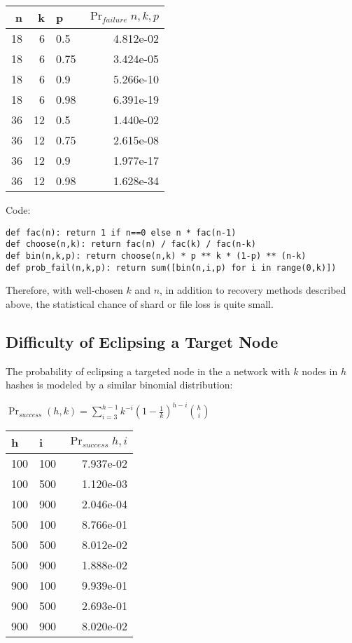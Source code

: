 \documentclass[a4paper,10pt]{article}
\begin{document}
\begin{table}[hbt!]
\begin{center}
\begin{tabular}{r r l r}
n & k & p & $\Pr_{failure}{n,k,p}$\\
\hline  18 & 6  &  0.5  & 4.812e-02\\
\hline  18 & 6  &  0.75 &3.424e-05\\
\hline  18 & 6  &  0.9  & 5.266e-10\\
\hline  18 & 6  &  0.98 &6.391e-19\\
\hline  36 & 12 &  0.5  &1.440e-02\\
\hline  36 & 12 &  0.75 &2.615e-08\\
\hline  36 & 12 &  0.9  &1.977e-17\\
\hline  36 & 12 &  0.98 &1.628e-34\\
\end{tabular}
\end{center}
\end{table}

Code:
\begin{lstlisting}
def fac(n): return 1 if n==0 else n * fac(n-1)
def choose(n,k): return fac(n) / fac(k) / fac(n-k)
def bin(n,k,p): return choose(n,k) * p ** k * (1-p) ** (n-k)
def prob_fail(n,k,p): return sum([bin(n,i,p) for i in range(0,k)])
\end{lstlisting}

Therefore, with well-chosen $ k $ and $ n $, in addition to recovery methods
described above, the statistical chance of shard or file loss is quite small.

\subsection{Difficulty of Eclipsing a Target Node}
The probability of eclipsing a targeted node in the a network with $ k $ nodes
in $ h $ hashes is modeled by a similar binomial distribution:

{\centering
$\Pr_{success}(h, k) = \displaystyle \sum_{i=3}^{h-1}
k^{-i}(1-\frac{1}{k})^{h-i}{h \choose i}$
\\}

\begin{table}[hbt!]
\begin{center}
\begin{tabular}{l l r}
h & i & $\Pr_{success}{h,i}$\\
\hline  100 & 100 & 7.937e-02\\
\hline  100 & 500 & 1.120e-03\\
\hline  100 & 900 & 2.046e-04\\
\hline  500 & 100 & 8.766e-01\\
\hline  500 & 500 & 8.012e-02\\
\hline  500 & 900 & 1.888e-02\\
\hline  900 & 100 & 9.939e-01\\
\hline  900 & 500 & 2.693e-01\\
\hline  900 & 900 & 8.020e-02\\
\end{tabular}
\end{center}
\end{table}
\end{document}
